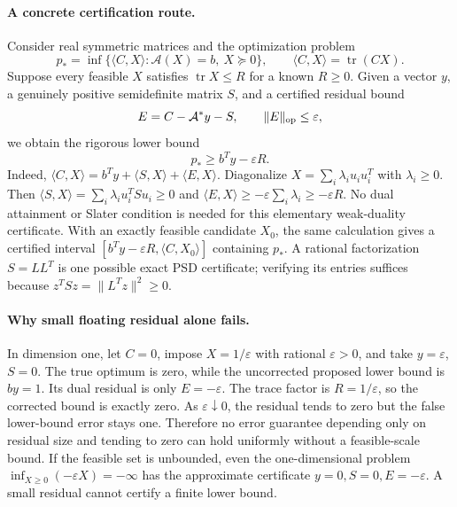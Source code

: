 \documentclass[11pt]{article}
\begin{document}
\paragraph{A concrete certification route.}
Consider real symmetric matrices and the optimization problem
\[
 p_* =\inf\{\langle C,X\rangle:\mathcal A(X)=b,\ X\succeq0\},
 \qquad \langle C,X\rangle=\operatorname{tr}(CX).
\]
Suppose every feasible $X$ satisfies $\operatorname{tr}X\leq R$ for a known
$R\geq0$. Given a vector $y$, a genuinely positive semidefinite matrix $S$,
and a certified residual bound
\[
 E=C-\mathcal A^*y-S,\qquad \|E\|_{\rm op}\leq\varepsilon,
\]
we obtain the rigorous lower bound
\[
 p_*\geq b^Ty-\varepsilon R.
\]
Indeed, $\langle C,X\rangle=b^Ty+\langle S,X\rangle+\langle E,X\rangle$.
Diagonalize $X=\sum_i\lambda_i u_i u_i^T$ with $\lambda_i\geq0$.
Then $\langle S,X\rangle=\sum_i\lambda_i u_i^TSu_i\geq0$ and
$\langle E,X\rangle\geq-\varepsilon\sum_i\lambda_i\geq-\varepsilon R$.
No dual attainment or Slater condition is needed for this elementary weak-duality
certificate. With an exactly feasible candidate $X_0$, the same calculation gives
a certified interval
$[b^Ty-\varepsilon R,\langle C,X_0\rangle]$ containing $p_*$.
A rational factorization $S=LL^T$ is one possible exact PSD certificate; verifying
its entries suffices because $z^TSz=\|L^Tz\|^2\geq0$.

\paragraph{Why small floating residual alone fails.}
In dimension one, let $C=0$, impose $X=1/\varepsilon$ with rational
$\varepsilon>0$, and take $y=\varepsilon$, $S=0$.
The true optimum is zero, while the uncorrected proposed lower bound is
$b y=1$. Its dual residual is only $E=-\varepsilon$.
The trace factor is $R=1/\varepsilon$, so the corrected bound is exactly zero.
As $\varepsilon\downarrow0$, the residual tends to zero but the false lower-bound
error stays one. Therefore no error guarantee depending only on residual size
and tending to zero can hold uniformly without a feasible-scale bound.
If the feasible set is unbounded, even the one-dimensional problem
$\inf_{X\geq0}(-\varepsilon X)=-\infty$ has the approximate certificate
$y=0,S=0,E=-\varepsilon$. A small residual cannot certify a finite lower bound.
\end{document}

